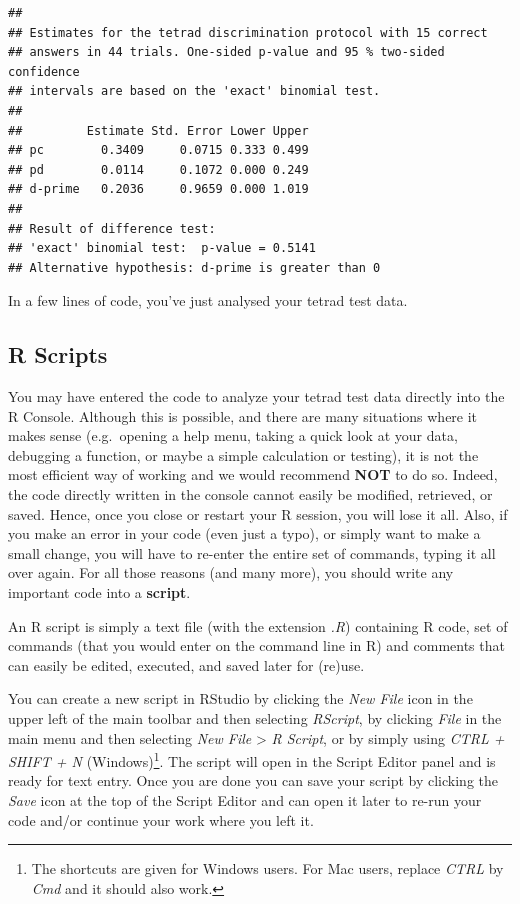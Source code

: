 \documentclass[
]{krantz}
\begin{document}
\begin{verbatim}
## 
## Estimates for the tetrad discrimination protocol with 15 correct
## answers in 44 trials. One-sided p-value and 95 % two-sided confidence
## intervals are based on the 'exact' binomial test. 
## 
##         Estimate Std. Error Lower Upper
## pc        0.3409     0.0715 0.333 0.499
## pd        0.0114     0.1072 0.000 0.249
## d-prime   0.2036     0.9659 0.000 1.019
## 
## Result of difference test:
## 'exact' binomial test:  p-value = 0.5141 
## Alternative hypothesis: d-prime is greater than 0
\end{verbatim}

In a few lines of code, you've just analysed your tetrad test data.

\hypertarget{scripts}{%
\subsection{R Scripts}\label{scripts}}

You may have entered the code to analyze your tetrad test data directly into the R Console. Although this is possible, and there are many situations where it makes sense (e.g.~opening a help menu, taking a quick look at your data, debugging a function, or maybe a simple calculation or testing), it is not the most efficient way of working and we would recommend \textbf{NOT} to do so. Indeed, the code directly written in the console cannot easily be modified, retrieved, or saved. Hence, once you close or restart your R session, you will lose it all. Also, if you make an error in your code (even just a typo), or simply want to make a small change, you will have to re-enter the entire set of commands, typing it all over again. For all those reasons (and many more), you should write any important code into a \textbf{script}.

An R script is simply a text file (with the extension \emph{.R}) containing R code, set of commands (that you would enter on the command line in R) and comments that can easily be edited, executed, and saved later for (re)use.

You can create a new script in RStudio by clicking the \emph{New File} icon in the upper left of the main toolbar and then selecting \emph{RScript}, by clicking \emph{File} in the main menu and then selecting \emph{New File} \textgreater{} \emph{R Script}, or by simply using \emph{CTRL + SHIFT + N} (Windows)\footnote{The shortcuts are given for Windows users. For Mac users, replace \emph{CTRL} by \emph{Cmd} and it should also work.}. The script will open in the Script Editor panel and is ready for text entry. Once you are done you can save your script by clicking the \emph{Save} icon at the top of the Script Editor and can open it later to re-run your code and/or continue your work where you left it.
\end{document}
